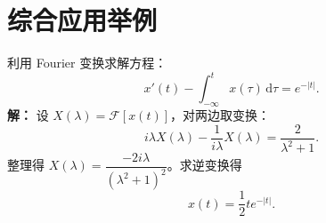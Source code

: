 \section{综合应用举例}

\begin{tcolorbox}[title=例 12：求解积分微分方程, colframe=orange!75!black, colback=orange!5!white, sharp corners]
  利用 Fourier 变换求解方程：
  \[
  x'(t)-\int_{-\infty}^{t}x(\tau)\,\mathrm{d}\tau = e^{-|t|}.
  \]
  \tcbline
  \textbf{解：} 设 $X(\lambda)=\mathcal{F}[x(t)]$，对两边取变换：
  \[
  i\lambda X(\lambda) - \frac{1}{i\lambda}X(\lambda) = \frac{2}{\lambda^2+1}.
  \]
  整理得 $X(\lambda) = \dfrac{-2i\lambda}{(\lambda^2+1)^2}$。求逆变换得
  \[
  x(t) = \frac{1}{2} t e^{-|t|}.
  \]
\end{tcolorbox}

